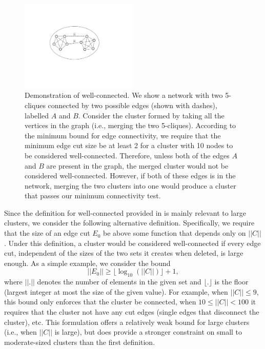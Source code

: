 \documentclass[a4paper]{article}   	%
\begin{document}
\begin{figure}[h!]
\centering
\includegraphics[width=0.5\textwidth]{figs/fig_clique.pdf}
\caption{Demonstration of well-connected. We show a network with two 5-cliques connected by two possible edges (shown with dashes), labelled $A$ and $B$.
Consider the cluster formed by taking all the vertices in the graph (i.e., merging the two 5-cliques).  According to the minimum bound for edge connectivity, we require that the minimum edge cut size be at least 2 for a cluster with 10 nodes to be considered well-connected.  Therefore, unless both of the edges $A$ and $B$ are present in the graph, the merged cluster  would not  be considered well-connected. 
However, if both of these edges is in the network, merging the two clusters into one would produce a cluster that passes our minimum connectivity test.}
\label{fig:2cliques}
\end{figure}

Since the definition for well-connected provided in \cite{Traag_2019} is mainly relevant to large clusters, we consider the
following alternative definition.
Specifically, we require that the size of an edge cut  $E_0$ be above some function that depends only on $||C||$.
Under this definition, a cluster would be considered well-connected if every edge cut, independent of the sizes of the
two sets it creates when deleted, is large enough.
As a simple example, we consider the bound  $$||E_0|| \geq  \lfloor \log_{10}(||C||) \rfloor +1,$$
where $||.||$ denotes the number of elements in the given set and
$\lfloor . \rfloor$ is the floor (largest integer at most the size of the given value).
For example, when $||C|| \leq 9$, this bound only enforces that the cluster be connected, when
$10 \leq ||C|| < 100$ it requires that  the cluster not have any cut edges (single edges that disconnect the cluster), etc.
This formulation offers a relatively weak bound for large clusters (i.e., when   $||C||$ is large), but does provide  a stronger constraint on small to moderate-sized clusters than the
first definition.
\end{document}
